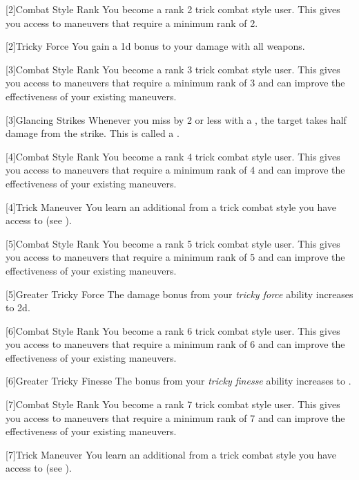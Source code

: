         {
            [2]{Combat Style Rank} You become a rank 2 trick combat style user.
            This gives you access to maneuvers that require a minimum rank of 2.

            [2]{Tricky Force} You gain a \plus1d bonus to your damage with all weapons.
        }

        {
            [3]{Combat Style Rank} You become a rank 3 trick combat style user.
            This gives you access to maneuvers that require a minimum rank of 3 and can improve the effectiveness of your existing maneuvers.

            [3]{Glancing Strikes} Whenever you miss by 2 or less with a , the target takes half damage from the strike.
            This is called a .
        }

        {
            [4]{Combat Style Rank} You become a rank 4 trick combat style user.
            This gives you access to maneuvers that require a minimum rank of 4 and can improve the effectiveness of your existing maneuvers.

            [4]{Trick Maneuver}
            You learn an additional  from a trick combat style you have access to (see ).
        }

        {
            [5]{Combat Style Rank} You become a rank 5 trick combat style user.
            This gives you access to maneuvers that require a minimum rank of 5 and can improve the effectiveness of your existing maneuvers.

            [5]{Greater Tricky Force} The damage bonus from your \textit{tricky force} ability increases to \plus2d.
        }

        {
            [6]{Combat Style Rank} You become a rank 6 trick combat style user.
            This gives you access to maneuvers that require a minimum rank of 6 and can improve the effectiveness of your existing maneuvers.

            [6]{Greater Tricky Finesse} The bonus from your \textit{tricky finesse} ability increases to .
        }

        {
            [7]{Combat Style Rank} You become a rank 7 trick combat style user.
            This gives you access to maneuvers that require a minimum rank of 7 and can improve the effectiveness of your existing maneuvers.

            [7]{Trick Maneuver}
            You learn an additional  from a trick combat style you have access to (see ).
        }

